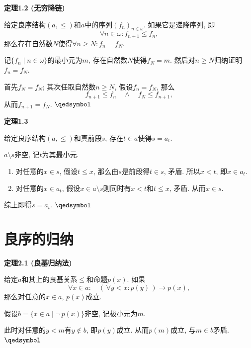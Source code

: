 \documentclass[UTF8]{ctexart}
\begin{document}
\vspace{10pt}

\hypertarget{sec:定理1.2}{}
\noindent\textbf{定理1.2 (无穷降链)}

给定良序结构$(a,\leqslant)$和$a$中的序列$(f_n)_{n\in\omega}$. 如果它是递降序列, 即
\[
    \forall n\in\omega:f_{n+1}\leqslant f_n,
\]
那么存在自然数$N$使得$\forall n\geqslant N:f_n=f_N$.


记$\{f_n\mid n\in\omega\}$的最小元为$m$, 存在自然数$N$使得$f_N=m$.
然后对$n\geqslant N$归纳证明$f_n=f_N$.

首先$f_N=f_N$; 其次任取自然数$n\geqslant N$, 假设$f_n=f_N$, 那么
\[
    f_{n+1}\leqslant f_n\quad\land\quad f_N\leqslant f_{n+1},
\]
从而$f_{n+1}=f_N$. \hfill $\qedsymbol$

\vspace{10pt}

\hypertarget{sec:定理1.3}{}
\noindent\textbf{定理1.3}

给定良序结构$(a,\leqslant)$和真前段$s$, 存在$t\in a$使得$s=a_t$.


$a\setminus s$非空, 记$t$为其最小元.

\begin{enumerate}
    \item 对任意的$x\in s$, 假设$t\leqslant x$,
    那么由$s$是前段得$t\in s$, 矛盾. 所以$x<t$, 即$x\in a_t$.
    \item 对任意的$x\in a_t$, 假设$x\in a\setminus s$则同时有$x<t$和$t\leqslant x$,
    矛盾. 从而$x\in s$.
\end{enumerate}
综上即得$s=a_t$. \hfill $\qedsymbol$





\newpage

\section{良序的归纳}

\hypertarget{sec:定理2.1}{}
\noindent\textbf{定理2.1 (良基归纳法)}

给定$a$和其上的良基关系$\leqslant$和命题$p(x)$. 如果
\[
    \forall x\in a:\quad(\,\forall y<x:p(y)\,)\to p(x),
\]
那么对任意的$x\in a$, $p(x)$成立.


假设$b=\{x\in a\mid\neg\,p(x)\}$非空, 记极小元为$m$.

此时对任意的$y<m$有$y\notin b$, 即$p(y)$成立. 从而$p(m)$成立, 与$m\in b$矛盾.
\hfill $\qedsymbol$
\end{document}
